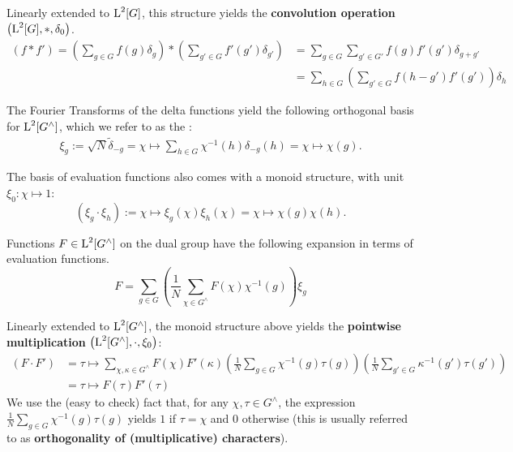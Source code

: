 Linearly extended to $\operatorname{L}^2[G]$, this structure yields the \textbf{convolution operation} $\left( \operatorname{L}^2[G],*,\delta_0 \right)$.
\begin{align}
\label{eqn:convolutionOperation}
\left(f * f'\right) = \left(\sum_{g\in G} f(g) \delta_g \right) * \left( \sum_{g' \in  G} f'(g') \delta_{g'} \right) &= \sum_{g\in G} \sum_{g'\in G'} f(g) f'(g') \delta_{g+g'} \\ 
&= \sum_{h\in G} \left(\sum_{g'\in G} f(h-g') f'(g')\right) \delta_h
\end{align}

The Fourier Transforms of the delta functions yield the following orthogonal basis for $\operatorname{L}^2[G^\wedge]$, which we refer to as the :
\begin{align*}
\xi_{g} := \sqrt{N}\tilde{\delta}_{-g} = \chi \mapsto \sum_{h \in G}\chi^{-1}(h)\delta_{-g}(h) = \chi \mapsto \chi(g).
\end{align*}

The basis of evaluation functions also comes with a monoid structure, with unit $\xi_0: \chi \mapsto 1$:
\begin{equation*}
  \left(\xi_g\cdot\xi_h\right):= \chi \mapsto \xi_g(\chi)\xi_h(\chi) = \chi \mapsto \chi(g)\chi(h).
\end{equation*}

Functions $F \in \operatorname{L}^2[G^\wedge]$ on the dual group have the following expansion in terms of evaluation functions.
\begin{equation*}
  F = \sum_{g\in G} \left( \frac{1}{N}\sum_{\chi \in G^\wedge} F(\chi) \chi^{-1}(g) \right) \xi_g
\end{equation*}

Linearly extended to $\operatorname{L}^2[G^\wedge]$, the monoid structure above yields the \textbf{pointwise multiplication} $\left( \operatorname{L}^2[G^\wedge],\cdot,\xi_0 \right)$: 
\begin{align}
\label{eqn:PointwiseMultCharacters}
  \left(F \cdot F' \right) &= \tau \mapsto \sum_{\chi,\kappa \in G^\wedge}  F(\chi)  F'(\kappa) \left(\frac{1}{N} \sum_{g\in G} \chi^{-1}(g)\tau(g)\right) \left(\frac{1}{N} \sum_{g'\in G}\kappa^{-1}(g') \tau(g') \right) \\ &= \tau \mapsto F(\tau) F'(\tau)
\end{align}
We use the (easy to check) fact that, for any $\chi,\tau \in G^\wedge$, the expression $\frac{1}{N} \sum_{g\in G}\chi^{-1}(g) \tau(g)$ yields $1$ if $\tau = \chi$ and $0$ otherwise (this is usually referred to as \textbf{orthogonality of (multiplicative) characters}).

